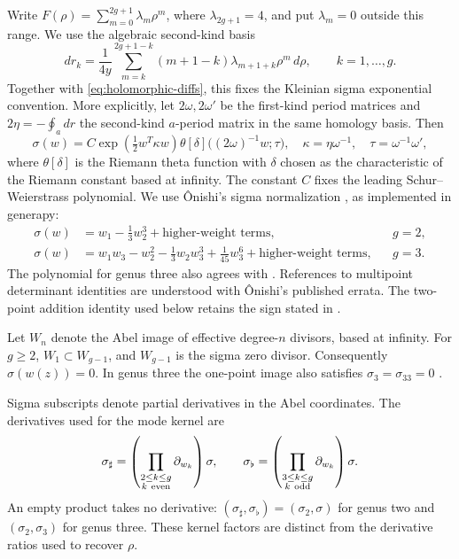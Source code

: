 \documentclass[11pt]{article}
\begin{document}
Write $F(\rho)=\sum_{m=0}^{2g+1}\lambda_m\rho^m$, where $\lambda_{2g+1}=4$, and put $\lambda_m=0$ outside this range. We use the algebraic second-kind basis \cite[Eq.~II.2]{thirdkind}
\begin{equation}\label{eq:second-kind-diffs}
dr_k=\frac{1}{4y}\sum_{m=k}^{2g+1-k}
(m+1-k)\lambda_{m+1+k}\rho^m\,d\rho,\qquad k=1,\ldots,g.
\end{equation}
Together with \eqref{eq:holomorphic-diffs}, this fixes the Kleinian sigma exponential convention. More explicitly, let $2\omega,2\omega'$ be the first-kind period matrices and $2\eta=-\oint_a dr$ the second-kind $a$-period matrix in the same homology basis. Then
\begin{equation}\label{eq:sigma-definition}
\sigma(w)=C\exp\!\left(\tfrac12w^T\kappa w\right)
\theta[\delta]\bigl((2\omega)^{-1}w;\tau\bigr),\quad
\kappa=\eta\omega^{-1},\quad \tau=\omega^{-1}\omega',
\end{equation}
where $\theta[\delta]$ is the Riemann theta function with $\delta$ chosen as the characteristic of the Riemann constant based at infinity. The constant $C$ fixes the leading Schur--Weierstrass polynomial. We use \^Onishi's sigma normalization \cite{onishi}, as implemented in generapy:
\begin{align}
\sigma(w)&=w_1-\tfrac13w_2^3+\text{higher-weight terms},&&g=2,\label{eq:sigma-leading-g2}\\
\sigma(w)&=w_1w_3-w_2^2-\tfrac13w_2w_3^3+\tfrac1{45}w_3^6
+\text{higher-weight terms},&&g=3.\label{eq:sigma-leading-g3}
\end{align}
The polynomial for genus three also agrees with \cite[Eq.~3.39]{enolski}. References to multipoint determinant identities are understood with \^Onishi's published errata. The two-point addition identity used below retains the sign stated in \cite[Lemma~7.1]{onishi}.

Let $W_n$ denote the Abel image of effective degree-$n$ divisors, based at infinity. For $g\ge2$, $W_1\subset W_{g-1}$, and $W_{g-1}$ is the sigma zero divisor. Consequently $\sigma(w(z))=0$. In genus three the one-point image also satisfies $\sigma_3=\sigma_{33}=0$ \cite[Section~VI]{thirdkind}.

Sigma subscripts denote partial derivatives in the Abel coordinates. The derivatives used for the mode kernel are \cite{onishi}
\begin{equation}\label{eq:sharp-flat}
\sigma_\sharp=\left(\prod_{\substack{2\le k\le g\\k\ {\rm even}}}\partial_{w_k}\right)\sigma,
\qquad
\sigma_\flat=\left(\prod_{\substack{3\le k\le g\\k\ {\rm odd}}}\partial_{w_k}\right)\sigma.
\end{equation}
An empty product takes no derivative: $(\sigma_\sharp,\sigma_\flat)=(\sigma_2,\sigma)$ for genus two and $(\sigma_2,\sigma_3)$ for genus three. These kernel factors are distinct from the derivative ratios used to recover $\rho$.
\end{document}
